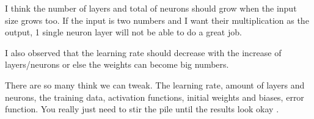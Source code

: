 \documentclass[a4paper,12pt]{article}
\theoremstyle{mytheoremstyle}
\theoremstyle{mytheoremstyle}
\theoremstyle{myproblemstyle}
\begin{document}
    I think the number of layers and total of neurons should grow when the
    input size grows too. If the input is two numbers and I want their
    multiplication as the output, 1 single neuron layer will not be able to do
    a great job.

    I also observed that the learning rate should decrease with the increase of
    layers/neurons or else the weights can become big numbers.

    There are so many think we can tweak. The learning rate, amount of layers
    and neurons, the training data, activation functions, initial weights and
    biases, error function. You really just need to stir the pile until the
    results look okay \cite{xkcd1838}.

    \medskip

    \printbibliography[
    heading=bibintoc,
    category=cited
    ]

    \printbibliography[
    heading=bibintoc,
    notcategory=cited,
    title={Other Resources}
    ]
\end{document}
